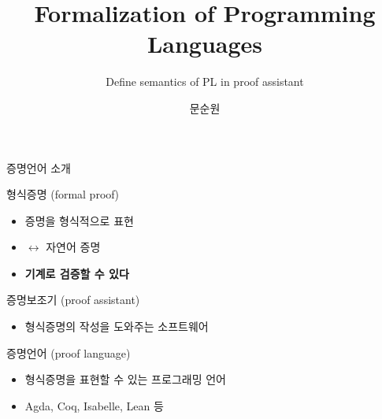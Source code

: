 \documentclass{beamer}
\title{Formalization of Programming Languages}
\subtitle{Define semantics of PL in proof assistant}
\author{문순원}
\date{}
\begin{document}
\begin{frame}
  \titlepage
\end{frame}

\begin{frame}{증명언어 소개}

  \begin{block} {형식증명 (formal proof)}
    \begin{itemize}
      \item 증명을 형식적으로 표현
      \item \( \leftrightarrow \) 자연어 증명
      \item \textbf{기계로 검증할 수 있다}
    \end{itemize}
  \end{block}

  \pause
  \begin{block} {증명보조기 (proof assistant)}
    \begin{itemize}
      \item 형식증명의 작성을 도와주는 소프트웨어
    \end{itemize}
  \end{block}

  \pause
  \begin{block} {증명언어 (proof language)}
    \begin{itemize}
      \item 형식증명을 표현할 수 있는 프로그래밍 언어
      \item Agda, Coq, Isabelle, Lean 등
    \end{itemize}
  \end{block}

\end{frame}
\end{document}
